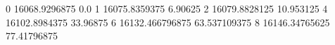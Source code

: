 0 16068.9296875 0.0
1 16075.8359375 6.90625
2 16079.8828125 10.953125
4 16102.8984375 33.96875
6 16132.466796875 63.537109375
8 16146.34765625 77.41796875
